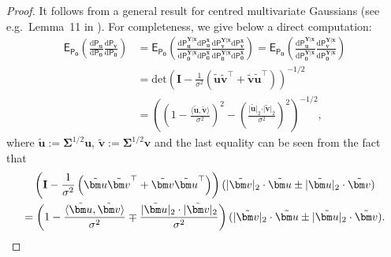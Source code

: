 \documentclass[11pt, a4paper]{article}
\newcommand{\mbf}{\mathbf}
\renewcommand{\l}{\left}
\renewcommand{\r}{\right}
\newcommand{\E}[0]{\mathsf{E}}
\newcommand{\p}{\mathsf{P}}
\theoremstyle{definition}
\theoremstyle{definition}
\theoremstyle{definition}
\theoremstyle{definition}
\theoremstyle{definition}
\theoremstyle{remark}
\theoremstyle{definition}
\theoremstyle{definition}
\theoremstyle{definition}
\begin{document}
\begin{proof}
It follows from a general result for centred multivariate Gaussians (see e.g.\ Lemma~11 in \citealp{CaGu17}). For completeness, we give below a direct computation: 
\begin{align*}
\E_{\p_{\bm 0}}\l(\frac{\mathrm{d}\p_{\bm u}}{\mathrm{d}\p_{\bm 0}}\frac{\mathrm{d}\p_{\bm v}}{\mathrm{d}\p_{\bm 0}}\r) & = \E_{\p_{\bm0}}\l(\frac{\mathrm{d}\p_{\bm u}^{\bm Y \vert \mbf x}\mathrm{d}\p_{\bm u}^{\mbf x}}{\mathrm{d}\p_{\bm 0}^{\bm Y \vert \mbf x}\mathrm{d}\p_{\bm 0}^{\mbf x}}\frac{\mathrm{d}\p_{\bm v}^{\bm Y \vert \mbf x}\mathrm{d}\p_{\bm v}^{\mbf x}}{\mathrm{d}\p_{\bm 0}^{\bm Y \vert \mbf x}\mathrm{d}\p_{\bm 0}^{\mbf x}}\r) =\E_{\p_{\bm0}}\l(\frac{\mathrm{d}\p_{\bm u}^{\bm Y \vert \mbf x}}{\mathrm{d}\p_{\bm 0}^{\bm Y \vert \mbf x}}\frac{\mathrm{d}\p_{\bm v}^{\bm Y \vert \mbf x}}{\mathrm{d}\p_{\bm 0}^{\bm Y \vert \mbf x}}\r) \nonumber \\
& = \mathrm{det}\l(\mbf I - \frac{1}{\sigma^2}\l(\tilde{\bm u} \tilde{\bm v}^{\top} + \tilde{\bm v}\tilde{\bm u}^{\top}\r)\r)^{-1/2} \nonumber \\
& = \l(\l(1-\frac{\langle\tilde{\bm u}, \tilde{\bm v}\rangle}{\sigma^2}\r)^2 - \l(\frac{\vert\tilde{\bm u}\vert_2\cdot\vert\tilde{\bm v}\vert_2}{\sigma^2}\r)^2\r)^{-1/2},
\end{align*}
where $\tilde{\bm u} := \bm\Sigma^{1/2}\bm u$, $\tilde{\bm v} := \bm\Sigma^{1/2}\bm v$ and the last equality can be seen from the fact that 
\begin{multline*}
\l(\mbf I - \frac{1}{\sigma^2}\l(\tilde{\bm u} \tilde{\bm v}^{\top} + \tilde{\bm v}\tilde{\bm u}^{\top}\r)\r) (\vert\tilde{\bm v}\vert_2\cdot\tilde{\bm u} \pm \vert\tilde{\bm u}\vert_2\cdot\tilde{\bm v}) \\
=  \l(1-\frac{\langle\tilde{\bm u}, \tilde{\bm v}\rangle}{\sigma^2} \mp  \frac{\vert\tilde{\bm u}\vert_2\cdot\vert\tilde{\bm v}\vert_2}{\sigma^2}\r)(\vert\tilde{\bm v}\vert_2\cdot\tilde{\bm u} \pm \vert\tilde{\bm u}\vert_2\cdot\tilde{\bm v}).\qedhere
\end{multline*}
\end{proof}
\end{document}
